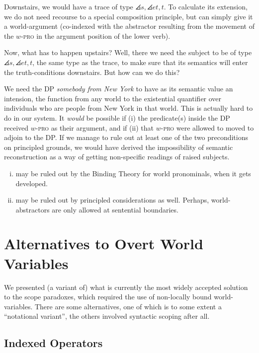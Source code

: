 Downstairs, we would have a trace of type $\angles{s,\angles{et,t}}$. To calculate its extension, we do not need recourse to a special composition principle, but can simply give it a world-argument (co-indexed with the abstractor resulting from the movement of the $w$-\textsc{pro} in the argument position of the lower verb).

Now, what has to happen upstairs? Well, there we need the subject to be of type $\angles{s,\angles{et,t}}$, the same type as the trace, to make sure that its semantics will enter the truth-conditions downstairs. But how can we do this?

We need the DP \emph{somebody from New York} to have as its semantic value an intension, the function from any world to the existential quantifier over individuals who are people from New York in that world. This is actually hard to do in our system. It \emph{would} be possible if (i) the predicate(s) inside the DP received $w$-\textsc{pro} as their argument, and if (ii) that $w$-\textsc{pro} were allowed to moved to adjoin to the DP. If we manage to rule out at least one of the two preconditions on principled grounds, we would have derived the impossibility of semantic reconstruction as a way of getting non-specific readings of raised subjects.

\begin{enumerate}[(i)] 
  \item may be ruled out by the Binding Theory for world pronominals, when it gets developed. 
  \item may be ruled out by principled considerations as well. Perhaps, world-abstractors are only allowed at sentential boundaries. %
\end{enumerate}

\section{Alternatives to Overt World Variables }

We presented (a variant of) what is currently the most widely accepted solution to the scope paradoxes, which required the use of non-locally bound world-variables. There are some alternatives, one of which is to some extent a ``notational variant'', the others involved syntactic scoping after all.

\subsection{Indexed Operators}

